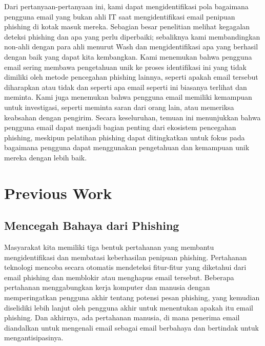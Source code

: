 \documentclass[lettersize,journal]{IEEEtran}
\begin{document}
Dari pertanyaan-pertanyaan ini, kami dapat mengidentifikasi pola bagaimana
pengguna email yang bukan ahli IT saat mengidentifikasi email penipuan phishing
di kotak masuk mereka. Sebagian besar penelitian melihat kegagalan deteksi
phishing dan apa yang perlu diperbaiki; sebaliknya kami membandingkan non-ahli
dengan para ahli menurut Wash dan mengidentifikasi apa yang berhasil dengan
baik yang dapat kita kembangkan. Kami menemukan bahwa pengguna email sering
membawa pengetahuan unik ke proses identifikasi ini yang tidak dimiliki oleh
metode pencegahan phishing lainnya, seperti apakah email tersebut diharapkan
atau tidak dan seperti apa email seperti ini biasanya terlihat dan meminta.
Kami juga menemukan bahwa pengguna email memiliki kemampuan untuk investigasi,
seperti meminta saran dari orang lain, atau memeriksa keabsahan dengan
pengirim. Secara keseluruhan, temuan ini menunjukkan bahwa pengguna email dapat
menjadi bagian penting dari ekosistem pencegahan phishing, meskipun pelatihan
phishing dapat ditingkatkan untuk fokus pada bagaimana pengguna dapat
menggunakan pengetahuan dan kemampuan unik mereka dengan lebih baik.

\section{Previous Work}

\subsection{Mencegah Bahaya dari Phishing}
Masyarakat kita memiliki tiga bentuk pertahanan yang membantu mengidentifikasi
dan membatasi keberhasilan penipuan phishing. Pertahanan teknologi mencoba
secara otomatis mendeteksi fitur-fitur yang diketahui dari email phishing dan
memblokir atau menghapus email tersebut. Beberapa pertahanan menggabungkan
kerja komputer dan manusia dengan memperingatkan pengguna akhir tentang potensi
pesan phishing, yang kemudian diselidiki lebih lanjut oleh pengguna akhir untuk
menentukan apakah itu email phishing. Dan akhirnya, ada pertahanan manusia, di
mana penerima email diandalkan untuk mengenali email sebagai email berbahaya dan
bertindak untuk mengantisipasinya.
\end{document}
